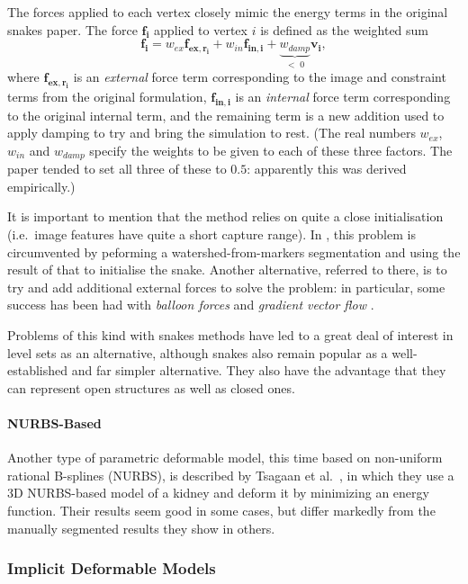 The forces applied to each vertex closely mimic the energy terms in the original snakes paper. The force $\mathbf{f_i}$ applied to vertex $i$ is defined as the weighted sum
%
\[
\mathbf{f_i} = w_{ex}\mathbf{f_{ex,r_i}} + w_{in}\mathbf{f_{in,i}} + \underbrace{w_{damp}}_{< \; 0}\mathbf{v_i},
\]
%
where $\mathbf{f_{ex,r_i}}$ is an \emph{external} force term corresponding to the image and constraint terms from the original formulation, $\mathbf{f_{in,i}}$ is an \emph{internal} force term corresponding to the original internal term, and the remaining term is a new addition used to apply damping to try and bring the simulation to rest. (The real numbers $w_{ex}$, $w_{in}$ and $w_{damp}$ specify the weights to be given to each of these three factors. The paper tended to set all three of these to $0.5$: apparently this was derived empirically.)

It is important to mention that the method relies on quite a close initialisation (i.e.\ image features have quite a short capture range). In \cite{ree05}, this problem is circumvented by peforming a watershed-from-markers segmentation and using the result of that to initialise the snake. Another alternative, referred to there, is to try and add additional external forces to solve the problem: in particular, some success has been had with \emph{balloon forces} \cite{cohen91} and \emph{gradient vector flow} \cite{xu98}.

Problems of this kind with snakes methods have led to a great deal of interest in level sets as an alternative, although snakes also remain popular as a well-established and far simpler alternative. They also have the advantage that they can represent open structures as well as closed ones.

\paragraph{NURBS-Based}

Another type of parametric deformable model, this time based on non-uniform rational B-splines (NURBS), is described by Tsagaan et al.\ \cite{tsagaan02}, in which they use a 3D NURBS-based model of a kidney and deform it by minimizing an energy function. Their results seem good in some cases, but differ markedly from the manually segmented results they show in others.

\subsubsection{Implicit Deformable Models}

